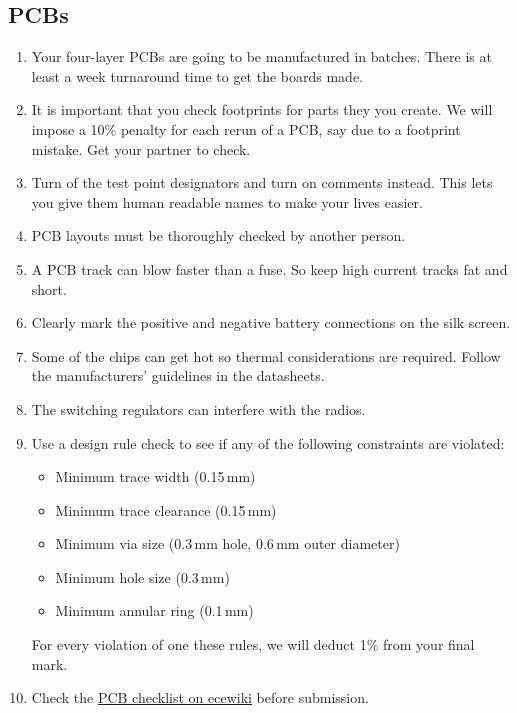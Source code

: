 \documentclass[11pt, a4paper]{article}
\begin{document}
\subsection{PCBs}

\begin{enumerate}
\item Your four-layer PCBs are going to be manufactured in batches.
  There is at least a week turnaround time to get the boards made.

\item It is important that you check footprints for parts they you
  create.  We will impose a 10\% penalty for each rerun of a PCB, say
  due to a footprint mistake.  Get your partner to check.

\item Turn of the test point designators and turn on comments
  instead. This lets you give them human readable names to make your
  lives easier.

\item PCB layouts must be thoroughly checked by another person.

\item A PCB track can blow faster than a fuse. So keep high current
  tracks fat and short.

\item Clearly mark the positive and negative battery connections on
  the silk screen.

\item Some of the chips can get hot so thermal considerations are
  required.  Follow the manufacturers' guidelines in the datasheets.

\item The switching regulators can interfere with the radios.

\item Use a design rule check to see if any of the following
  constraints are violated:
%
\begin{itemize}
\item Minimum trace width (0.15\,mm)
\item Minimum trace clearance (0.15\,mm)
\item Minimum via size (0.3\,mm hole, 0.6\,mm outer diameter)
\item Minimum hole size (0.3\,mm)
\item Minimum annular ring (0.1\,mm)
\end{itemize}
%
For every violation of one these rules, we will deduct 1\% from your
final mark.

\item Check the
  \href{http://ecewiki.elec.canterbury.ac.nz/mediawiki/index.php/PCB_checklist}{PCB
    checklist on ecewiki} before submission.
\end{enumerate}
\end{document}
